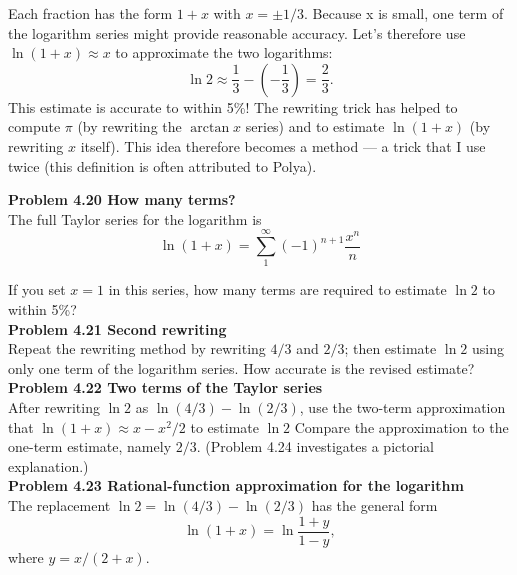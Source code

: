 \documentclass[12pt]{book}
\begin{document}
Each fraction has the form $1+x$ with $x=\pm 1\!/3$. Because x is small, one
term of the logarithm series might provide reasonable accuracy. Let's therefore use $\ln(1+x)\approx x$ to approximate the two logarithms:
\begin{equation}
\ln2\approx \frac 13 - (-\frac 13)=\frac 23.
\end{equation}
This estimate is accurate to within 5\%!
The rewriting trick has helped to compute $\pi$ (by rewriting the $\arctan{x}$ series) and to estimate $\ln(1+x)$ (by rewriting $x$ itself). This idea therefore becomes a method --- a trick that I use twice (this definition is often attributed to Polya).\\

\colorbox{light-gray}{
\begin{minipage}{\textwidth}
{\bf Problem 4.20 How many terms?}\\
The full Taylor series for the logarithm is
\begin{equation}
\ln(1+x)=\sum_{1}^\infty (-1)^{n+1} \frac {x^{n}}n
\end{equation}

If you set $x=1$ in this series, how many terms are required to estimate $\ln2$ to within 5\%?\\

{\bf Problem 4.21 Second rewriting}\\
Repeat the rewriting method by rewriting $ 4\!/3$ and $ 2\!/3$; then estimate $\ln2$ using only one term of the logarithm series. How accurate is the revised estimate?\\

{\bf Problem 4.22 Two terms of the Taylor series}\\

After rewriting $\ln2$ as $\ln(4\!/3) - \ln(2\!/3)$, use the two-term approximation that $\ln(1+x)\approx x-x^2\!/2$ to estimate $\ln2$ Compare the approximation to the one-term estimate, namely $ 2\!/3$. (Problem 4.24 investigates a pictorial explanation.)\\

{\bf Problem 4.23 Rational-function approximation for the logarithm}\\
The replacement $\ln2=\ln(4\!/3) - \ln(2\!/3)$ has the general form
\begin{equation}
\ln(1+x)=\ln \frac{1+y}{1-y},
\end{equation}
where $y=x\!/(2+x)$.
\end{minipage}
}
\end{document}
